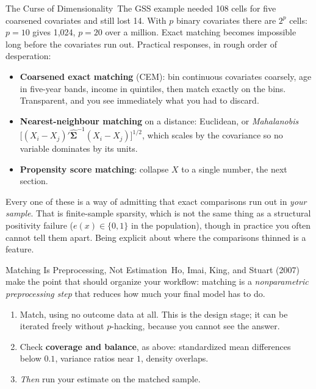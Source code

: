 \documentclass[aspectratio=169,11pt,xcolor=dvipsnames]{beamer}
\newcommand{\srct}[1]{#1}
\newcommand{\core}{\,\raisebox{0.6pt}{\textcolor{corestar}{$\bigstar$}}}
\begin{document}
\begin{frame}[allowframebreaks,t]{The Curse of Dimensionality\core}
The GSS example needed 108 cells for five coarsened covariates and still lost
14. With $p$ binary covariates there are $2^p$ cells: $p=10$ gives 1{,}024,
$p=20$ over a million. Exact matching becomes impossible long before the
covariates run out.
\vskip4pt
Practical responses, in rough order of desperation:
\begin{itemize}\itemsep3pt
  \item \textbf{Coarsened exact matching} (CEM): bin continuous covariates
        coarsely, age in five-year bands, income in quintiles, then match
        exactly on the bins. Transparent, and you see immediately what you had to
        discard.
  \item \textbf{Nearest-neighbour matching} on a distance: Euclidean, or
        \emph{Mahalanobis} $\big[(X_i - X_j)'\hat{\bm\Sigma}^{-1}(X_i - X_j)\big]^{1/2}$,
        which scales by the covariance so no variable dominates by its units.
  \item \textbf{Propensity score matching}: collapse $X$ to a single number, 
        the next section.
\end{itemize}
\vskip3pt
\alert{Every one of these is a way of admitting that exact comparisons run out in
\emph{your sample}.} That is finite-sample sparsity, which is not the same thing
as a structural positivity failure ($e(x)\in\{0,1\}$ in the population), though
in practice you often cannot tell them apart. Being explicit about where the
comparisons thinned is a feature.
\end{frame}

\begin{frame}{Matching Is Preprocessing, Not Estimation\core}
\srct{Ho, Imai, King, and Stuart (2007)} make the point that should organize your
workflow: matching is a \emph{nonparametric preprocessing step} that reduces how
much your final model has to do.
\vskip2pt
\begin{enumerate}\itemsep2pt
  \item Match, using \alert{no outcome data at all}. This is the design stage; it
        can be iterated freely without $p$-hacking, because you cannot see the
        answer.
  \item Check \textbf{coverage and balance}, as above: standardized mean
        differences below $0.1$, variance ratios near $1$, density overlaps.
  \item \emph{Then} run your estimate on the matched sample.
\end{enumerate}
\end{frame}
\end{document}
